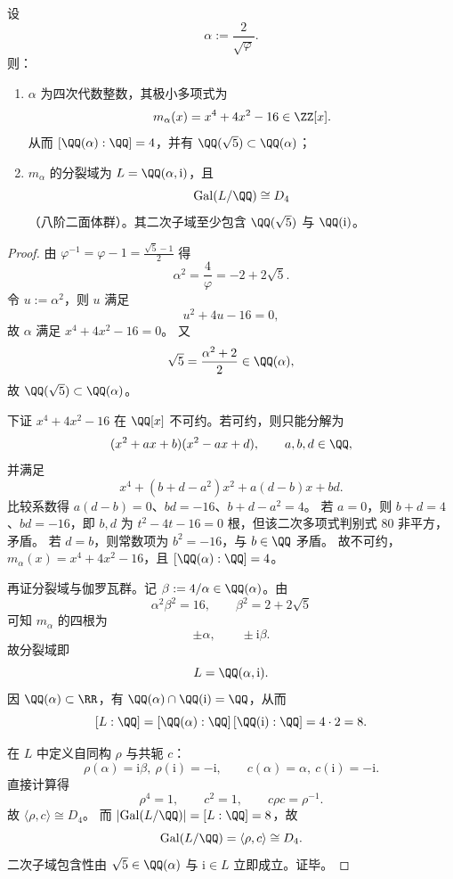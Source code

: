 \begin{theorem}\label{thm:near1-alpha-minpoly-splitting-d4}
设
\[
\alpha:=\frac{2}{\sqrt\varphi}.
\]
则：
\begin{enumerate}
  \item \(\alpha\) 为四次代数整数，其极小多项式为
  \[
  m_\alpha(x)=x^4+4x^2-16\in\ZZ[x].
  \]
  从而 \([\QQ(\alpha):\QQ]=4\)，并有 \(\QQ(\sqrt5)\subset\QQ(\alpha)\)；
  \item \(m_\alpha\) 的分裂域为 \(L=\QQ(\alpha,\mathrm{i})\)，且
  \[
  \mathrm{Gal}(L/\QQ)\cong D_4
  \]
  （八阶二面体群）。其二次子域至少包含 \(\QQ(\sqrt5)\) 与 \(\QQ(\mathrm{i})\)。
\end{enumerate}
\end{theorem}
\begin{proof}
由 \(\varphi^{-1}=\varphi-1=\frac{\sqrt5-1}{2}\) 得
\[
\alpha^2=\frac{4}{\varphi}=-2+2\sqrt5.
\]
令 \(u:=\alpha^2\)，则 \(u\) 满足
\[
u^2+4u-16=0,
\]
故 \(\alpha\) 满足 \(x^4+4x^2-16=0\)。
又
\[
\sqrt5=\frac{\alpha^2+2}{2}\in\QQ(\alpha),
\]
故 \(\QQ(\sqrt5)\subset\QQ(\alpha)\)。

下证 \(x^4+4x^2-16\) 在 \(\QQ[x]\) 不可约。若可约，则只能分解为
\[
(x^2+ax+b)(x^2-ax+d),\qquad a,b,d\in\QQ,
\]
并满足
\[
x^4+(b+d-a^2)x^2+a(d-b)x+bd.
\]
比较系数得 \(a(d-b)=0\)、\(bd=-16\)、\(b+d-a^2=4\)。
若 \(a=0\)，则 \(b+d=4\)、\(bd=-16\)，即 \(b,d\) 为 \(t^2-4t-16=0\) 根，但该二次多项式判别式 \(80\) 非平方，矛盾。
若 \(d=b\)，则常数项为 \(b^2=-16\)，与 \(b\in\QQ\) 矛盾。
故不可约，\(m_\alpha(x)=x^4+4x^2-16\)，且 \([\QQ(\alpha):\QQ]=4\)。

再证分裂域与伽罗瓦群。记 \(\beta:=4/\alpha\in\QQ(\alpha)\)。由
\[
\alpha^2\beta^2=16,\qquad \beta^2=2+2\sqrt5
\]
可知 \(m_\alpha\) 的四根为
\[
\pm\alpha,\qquad \pm \mathrm{i}\beta.
\]
故分裂域即
\[
L=\QQ(\alpha,\mathrm{i}).
\]
因 \(\QQ(\alpha)\subset\RR\)，有 \(\QQ(\alpha)\cap\QQ(\mathrm{i})=\QQ\)，从而
\[
[L:\QQ]=[\QQ(\alpha):\QQ]\,[\QQ(\mathrm{i}):\QQ]=4\cdot 2=8.
\]

在 \(L\) 中定义自同构 \(\rho\) 与共轭 \(c\)：
\[
\rho(\alpha)=\mathrm{i}\beta,\ \rho(\mathrm{i})=-\mathrm{i},
\qquad
c(\alpha)=\alpha,\ c(\mathrm{i})=-\mathrm{i}.
\]
直接计算得
\[
\rho^4=1,\qquad c^2=1,\qquad c\rho c=\rho^{-1}.
\]
故 \(\langle \rho,c\rangle\cong D_4\)。
而 \(|\mathrm{Gal}(L/\QQ)|=[L:\QQ]=8\)，故
\[
\mathrm{Gal}(L/\QQ)=\langle \rho,c\rangle\cong D_4.
\]
二次子域包含性由 \(\sqrt5\in\QQ(\alpha)\) 与 \(\mathrm{i}\in L\) 立即成立。证毕。
\end{proof}

